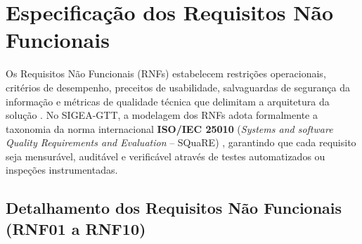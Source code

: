 \chapter{Especificação dos Requisitos Não Funcionais}
\label{cap_requisitos_nao_funcionais}

Os Requisitos Não Funcionais (RNFs) estabelecem restrições operacionais, critérios de desempenho, preceitos de usabilidade, salvaguardas de segurança da informação e métricas de qualidade técnica que delimitam a arquitetura da solução \cite{pressman2021,sommerville2019}. No SIGEA-GTT, a modelagem dos RNFs adota formalmente a taxonomia da norma internacional \textbf{ISO/IEC 25010} (\textit{Systems and software Quality Requirements and Evaluation} -- SQuaRE) \cite{iso25010}, garantindo que cada requisito seja mensurável, auditável e verificável através de testes automatizados ou inspeções instrumentadas.

\section{Detalhamento dos Requisitos Não Funcionais (RNF01 a RNF10)}
\label{sec_detalhamento_rnf}

